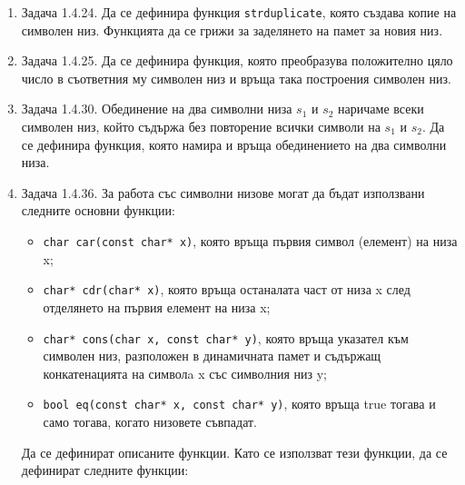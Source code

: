{\begin{enumerate}


\item Задача 1.4.24. \cite{sbornik} Да се дефинира функция \texttt{strduplicate}, която създава копие на символен низ. Функцията да се грижи за заделянето на памет за новия низ.

\item Задача 1.4.25.  \cite{sbornik}  Да се дефинира функция, която преобразува положително цяло число в съответния му символен низ и връща така построения символен низ.

\item Задача 1.4.30.  \cite{sbornik}  Обединение на два символни низа $s_1$ и $s_2$ наричаме всеки символен низ, който съдържа без повторение всички символи на $s_1$ и $s_2$. Да се дефинира функция, която намира и връща обединението на два символни низа.

\item Задача 1.4.36. За  \cite{sbornik}  работа със символни низове могат да бъдат използвани следните основни функции:

\begin{itemize}

\item \texttt{char car(const char* x)}, която връща първия символ (елемент) на низа x;
\item \texttt{char* cdr(char* x)}, която връща останалата част от низа x след отделянето на първия елемент на низа x;
\item \texttt{char* cons(char x, const char* y)}, която връща указател към символен низ, разположен в динамичната памет и съдържащ конкатенацията на символa x със символния низ y;

\item \texttt{bool eq(const char* x, const char* y)}, която връща true тогава и само тогава, когато низовете съвпадат.


\end{itemize}
Да се дефинират описаните функции. Като се използват тези функции, да се дефинират следните функции:

\begin{itemize}


\end{itemize}
\end{enumerate}}
